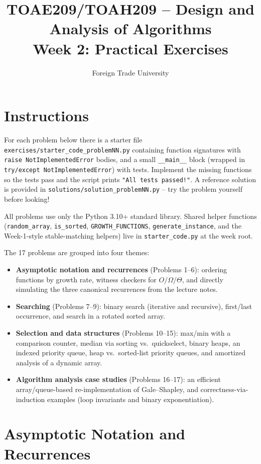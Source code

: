\documentclass[11pt]{article}
\title{TOAE209/TOAH209 -- Design and Analysis of Algorithms\\[4pt]
\large Week 2: Practical Exercises}
\author{Foreign Trade University}
\date{}
\begin{document}
\maketitle

\section*{Instructions}

For each problem below there is a starter file
\texttt{exercises/starter\_code\_problemNN.py} containing function signatures with
\texttt{raise NotImplementedError} bodies, and a small \texttt{\_\_main\_\_} block (wrapped
in \texttt{try/except NotImplementedError}) with tests. Implement the missing functions so
the tests pass and the script prints \texttt{"All tests passed!"}. A reference solution is
provided in \texttt{solutions/solution\_problemNN.py} -- try the problem yourself before
looking!

All problems use only the Python 3.10+ standard library. Shared helper functions
(\texttt{random\_array}, \texttt{is\_sorted}, \texttt{GROWTH\_FUNCTIONS},
\texttt{generate\_instance}, and the Week-1-style stable-matching helpers) live in
\texttt{starter\_code.py} at the week root.

The 17 problems are grouped into four themes:
\begin{itemize}
    \item \textbf{Asymptotic notation and recurrences} (Problems 1--6): ordering functions
    by growth rate, witness checkers for $O/\Omega/\Theta$, and directly simulating the
    three canonical recurrences from the lecture notes.
    \item \textbf{Searching} (Problems 7--9): binary search (iterative and recursive),
    first/last occurrence, and search in a rotated sorted array.
    \item \textbf{Selection and data structures} (Problems 10--15): max/min with a
    comparison counter, median via sorting vs.\ quickselect, binary heaps, an indexed
    priority queue, heap vs.\ sorted-list priority queues, and amortized analysis of a
    dynamic array.
    \item \textbf{Algorithm analysis case studies} (Problems 16--17): an efficient
    array/queue-based re-implementation of Gale--Shapley, and correctness-via-induction
    examples (loop invariants and binary exponentiation).
\end{itemize}

\newpage
\section{Asymptotic Notation and Recurrences}
\end{document}
